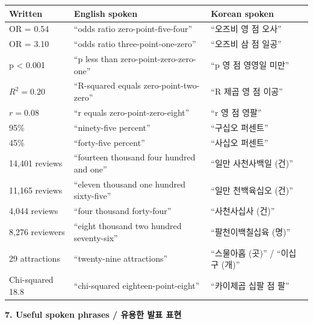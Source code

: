 \documentclass[10pt,a4paper]{article}
\begin{document}
\begin{longtable}{@{}p{4.5cm} p{5.5cm} p{6cm}@{}}
\toprule
\textbf{Written} & \textbf{English spoken} & \textbf{Korean spoken} \\
\midrule
OR = 0.54               & ``odds ratio zero-point-five-four''                           & ``오즈비 영 점 오사'' \\
OR = 3.10               & ``odds ratio three-point-one-zero''                           & ``오즈비 삼 점 일공'' \\
p < 0.001               & ``p less than zero-point-zero-zero-one''                     & ``p 영 점 영영일 미만'' \\
$R^2 = 0.20$             & ``R-squared equals zero-point-two-zero''                    & ``R 제곱 영 점 이공'' \\
$r = 0.08$               & ``r equals zero-point-zero-eight''                           & ``r 영 점 영팔'' \\
95\%                     & ``ninety-five percent''                                       & ``구십오 퍼센트'' \\
45\%                     & ``forty-five percent''                                        & ``사십오 퍼센트'' \\
14,401 reviews          & ``fourteen thousand four hundred and one''                   & ``일만 사천사백일 (건)'' \\
11,165 reviews          & ``eleven thousand one hundred sixty-five''                   & ``일만 천백육십오 (건)'' \\
4,044 reviews           & ``four thousand forty-four''                                 & ``사천사십사 (건)'' \\
8,276 reviewers         & ``eight thousand two hundred seventy-six''                   & ``팔천이백칠십육 (명)'' \\
29 attractions          & ``twenty-nine attractions''                                   & ``스물아홉 (곳)'' / ``이십구 (개)'' \\
Chi-squared 18.8        & ``chi-squared eighteen-point-eight''                         & ``카이제곱 십팔 점 팔'' \\
\bottomrule
\end{longtable}

\vspace{10pt}
\noindent\normalsize\textbf{\large 7. Useful spoken phrases / 유용한 발표 표현}
\end{document}
